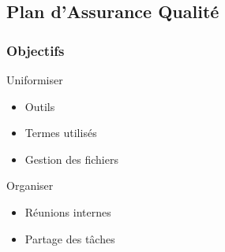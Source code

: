 \subsection{Plan d'Assurance Qualité}

\begin{frame}
\tableofcontents[subsectionstyle=show/shaded/hide, subsubsectionstyle=hide, sectionstyle=show/hide]
\end{frame}

\begin{frame}
\frametitle{Objectifs}

\begin{block}{Uniformiser}
\begin{itemize}
	\item Outils
	\item Termes utilisés
	\item Gestion des fichiers
\end{itemize}
\end{block} %

\pause 

\begin{block}{Organiser}
\begin{itemize}
	\item Réunions internes
	\item Partage des tâches
\end{itemize}
\end{block} %

\end{frame} %

